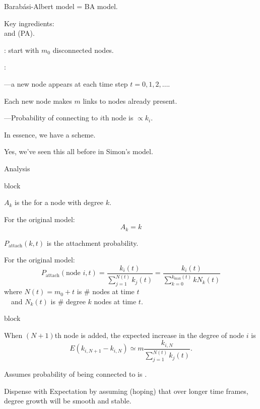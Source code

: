      
      Barab\'{a}si-Albert model = BA model.
     
      Key ingredients:\\
       and  (PA).
     
      : start with $m_0$ disconnected nodes.
     
      : 
      
        
        ---a new node appears at each time step $t=0,1,2, \ldots$.
       
        Each new node makes $m$ links to nodes already present.
       
        ---Probability 
        of connecting to $i$th node is $\propto k_i$.
      
    
      In essence, we have a  scheme.
    
      Yes, we've seen this all before in Simon's model.
    
  

{Analysis}

{block}{}
   
   
      $A_k$ is the 
     for a node with degree $k$.
   
     For the original model:
     $$ A_k = k$$
   
      $P_{\textrm{attach}}(k,t)$ 
     is the attachment probability.
   
     For the original model:
     $$
     P_{\textrm{attach}}(\mbox{node $i$},t)
     =
     \frac{k_i(t)}
     {
       \sum_{j=1}^{N(t)} k_j(t)
     }
     {
       =
       \frac{k_i(t)}
       {
         \sum_{k=0}^{k_{\textrm{max}}(t)} k N_k(t)
       }
     }
     $$
     {
       where $N(t) = m_0 + t$ is \# nodes at time $t$\\
     }
     {
       \ \ and $N_k(t)$ is \# degree $k$ nodes at time $t$.
     }
   
 

{block}{}
 
 
   When $(N+1)$th node is added, 
   the expected increase in the degree of node $i$ is 
   $$
   E(k_{i,N+1} - k_{i,N}) 
   \simeq 
   m
   \frac{k_{i,N}}
   {
     \sum_{j=1}^{N(t)} k_j(t)
   }.
   $$
 
   Assumes probability of being connected to is .
 
   Dispense with Expectation by assuming (hoping)
   that over longer time frames, degree growth will
   be smooth and stable.
 
